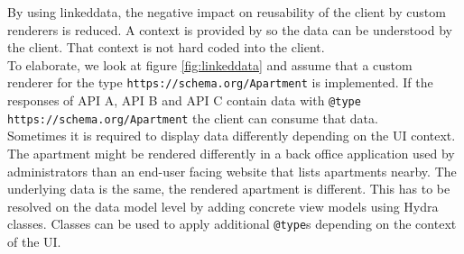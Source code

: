 By using \gls{linkeddata}, the negative impact on reusability of the client by custom renderers is reduced. A context is provided by so the data can be understood by the client. That context is not hard coded into the client. \\
To elaborate, we look at figure \ref{fig:linkeddata} and assume that a custom renderer for the type \lstinline{https://schema.org/Apartment} is implemented. If the responses of API A, API B and API C contain data with \lstinline{@type} \lstinline{https://schema.org/Apartment} the client can consume that data. \\
Sometimes it is required to display data differently depending on the UI context. The apartment might be rendered differently in a back office application used by administrators than an end-user facing website that lists apartments nearby. The underlying data is the same, the rendered apartment is different. This has to be resolved on the data model level by adding concrete view models using Hydra classes. Classes can be used to apply additional \lstinline{@type}s depending on the context of the UI.
